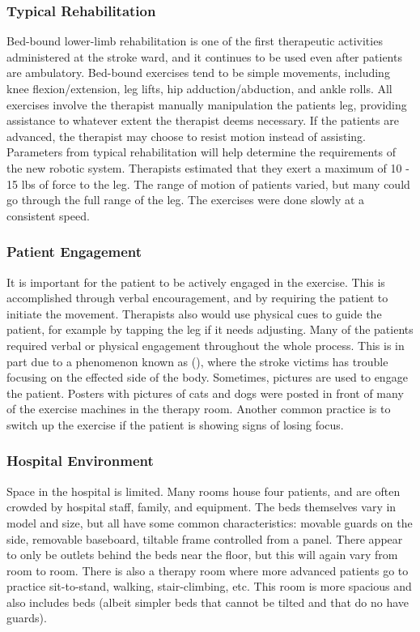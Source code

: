 \documentclass[12pt]{report}
\begin{document}
	\subsubsection{Typical Rehabilitation}
	
	Bed-bound lower-limb rehabilitation is one of the first therapeutic activities administered at the stroke ward, and it continues to be used even after patients are ambulatory. Bed-bound exercises tend to be simple movements, including knee flexion/extension, leg lifts, hip adduction/abduction, and ankle rolls. All exercises involve the therapist manually manipulation the patients leg, providing assistance to whatever extent the therapist deems necessary. If the patients are advanced, the therapist may choose to resist motion instead of assisting. 
	Parameters from typical rehabilitation will help determine the requirements of the new robotic system. Therapists estimated that they exert a maximum of 10 - 15 lbs of force to the leg. The range of motion of patients varied, but many could go through the full range of the leg. The exercises were done slowly at a consistent speed. 
	
	\subsubsection{Patient Engagement} 
	 It is important for the patient to be actively engaged in the exercise. This is accomplished through verbal encouragement, and by requiring the patient to initiate the movement. Therapists also would use physical cues to guide the patient, for example by tapping the leg if it needs adjusting. Many of the patients required verbal or physical engagement throughout the whole process. This is in part due to a phenomenon known as (), where the stroke victims has trouble focusing on the effected side of the body. Sometimes, pictures are used to engage the patient. Posters with pictures of cats and dogs were posted in front of many of the exercise machines in the therapy room. Another common practice is to switch up the exercise if the patient is showing signs of losing focus. 
	 
	 \subsubsection{Hospital Environment}
	Space in the hospital is limited. Many rooms house four patients, and are often crowded by hospital staff, family, and equipment. The beds themselves vary in model and size, but all have some common characteristics: movable guards on the side, removable baseboard, tiltable frame controlled from a panel. There appear to only be outlets behind the beds near the floor, but this will again vary from room to room. 
	There is also a therapy room where more advanced patients go to practice sit-to-stand, walking, stair-climbing, etc. This room is more spacious and also includes beds (albeit simpler beds that cannot be tilted and that do no have guards). 
	 
\end{document}
